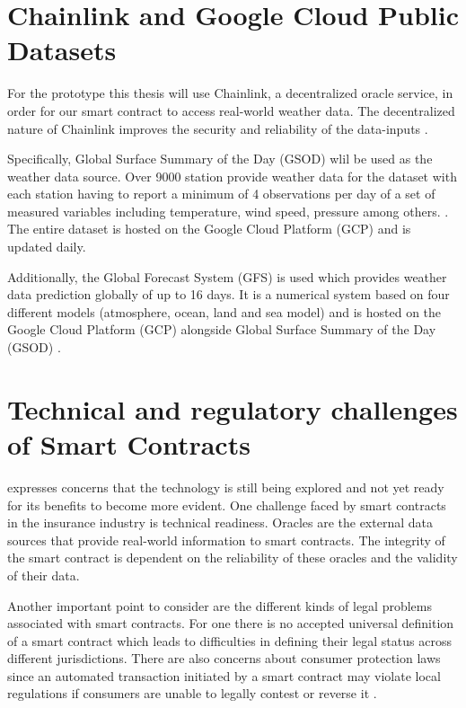  \section{Chainlink and Google Cloud Public Datasets}\label{section:chainlink_google_cloud_datasets}
 
 For the prototype this thesis will use Chainlink, a decentralized oracle service, in order for our smart contract to access real-world weather data. The decentralized nature of Chainlink improves the security and reliability of the data-inputs \autocite{beniiche2020study}.
 
 Specifically, Global Surface Summary of the Day (GSOD) wlil be used as the weather data source. Over 9000 station provide weather data for the dataset with each station having to report a minimum of 4 observations per day of a set of measured variables including temperature, wind speed, pressure among others. \autocite{NOAA_GSOD_2023}. The entire dataset is hosted on the Google Cloud Platform (GCP) and is updated daily.
 
 Additionally, the Global Forecast System (GFS) is used which provides weather data prediction globally of up to 16 days. It is a numerical system based on four different models (atmosphere, ocean, land and sea model) and is hosted on the Google Cloud Platform (GCP) alongside Global Surface Summary of the Day (GSOD) \autocite{NOAA_GSOD_nd}.
 
 \section{Technical and regulatory challenges of Smart Contracts}\label{section:regulatory_technical_challenges}
 
 \autocite{gatteschi2018blockchain} expresses concerns that the technology is still being explored and not yet ready for its benefits to become more evident. One challenge faced by smart contracts in the insurance industry is technical readiness. Oracles are the external data sources that provide real-world information to smart contracts. The integrity of the smart contract is dependent on the reliability of these oracles and the validity of their data. 
 
 Another important point to consider are the different kinds of legal problems associated with smart contracts. For one there is no accepted universal definition of a smart contract which leads to difficulties in defining their legal status across different jurisdictions. There are also concerns about consumer protection laws since an automated transaction initiated by a smart contract may violate local regulations if consumers are unable to legally contest or reverse it \autocite{ferreira2021regulating}.



